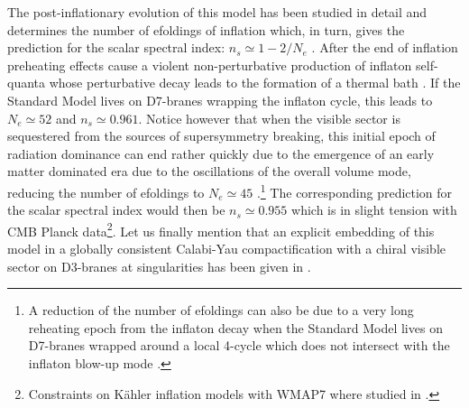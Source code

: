The post-inflationary evolution of this model has been studied in detail and determines the number of efoldings of inflation which, in turn, gives the prediction for the scalar spectral index: $n_s\simeq 1-2/N_e$ \cite{Martin:2013tda}. 
After the end of inflation preheating effects cause a violent non-perturbative production of inflaton self-quanta \cite{Barnaby:2009wr} whose perturbative decay leads to the formation of a thermal bath \cite{Cicoli:2010ha,Cicoli:2010yj,Allahverdi:2020uax}. If the Standard Model lives on D7-branes wrapping the inflaton cycle, this leads to $N_e\simeq 52$ and $n_s\simeq 0.961$. Notice however that when the visible sector is sequestered from the sources of supersymmetry breaking, this initial epoch of radiation dominance can end rather quickly due to the emergence of an early matter dominated era due to the oscillations of the overall volume mode, reducing the number of efoldings to $N_e\simeq 45$ \cite{Cicoli:2016olq}.\footnote{A reduction of the number of efoldings can also be due to a very long reheating epoch from the inflaton decay when the Standard Model lives on D7-branes wrapped around a local 4-cycle which does not intersect with the inflaton blow-up mode \cite{Cicoli:2022fzy}.} The corresponding prediction for the scalar spectral index would then be $n_s\simeq 0.955$ which is in slight tension with CMB Planck data\footnote{Constraints on K\"ahler inflation models with  WMAP7 where studied in \cite{Lee:2010tk}.}\cite{Bhattacharya:2017ysa,Bhattacharya:2017pws}. Let us finally mention that an explicit embedding of this model in a globally consistent Calabi-Yau compactification with a chiral visible sector on D3-branes at singularities has been given in \cite{Cicoli:2017shd}. 


